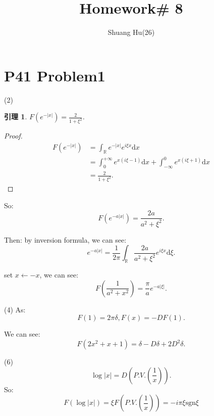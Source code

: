\documentclass[a4paper]{ctexart}
\title{Homework\# 8}
\author{Shuang Hu(26)}
\newtheorem{Lem}{\hspace{2em}引理}
\newcommand{\dif}{\mathrm{d}}
\begin{document}
\maketitle
\section*{P41 Problem1}
(2)

\begin{Lem}
    $F(e^{-|x|})=\frac{2}{1+\xi^{2}}$.
\end{Lem}
\begin{proof}
    \begin{equation}
        \begin{aligned}
            F(e^{-|x|})&=\int_{\mathbb{R}}e^{-|x|}e^{i\xi x}\dif x\\
            &=\int_{0}^{+\infty}e^{x(i\xi-1)}\dif x+\int_{-\infty}^{0}e^{x(i\xi+1)}\dif x\\
            &=\frac{2}{1+\xi^{2}}.
        \end{aligned}
    \end{equation}
\end{proof}
So: 
\begin{equation}
    F(e^{-a|x|})=\frac{2a}{a^{2}+\xi^{2}}.
\end{equation}

Then: by inversion formula, we can see:
\begin{equation}
    e^{-a|x|}=\frac{1}{2\pi}\int_{\mathbb{R}}\frac{2a}{a^{2}+\xi^{2}}e^{i\xi x}\dif\xi.
\end{equation}

set $x\leftarrow -x$, we can see:
\begin{equation}
    F(\frac{1}{a^{2}+x^{2}})=\frac{\pi}{a}e^{-a|\xi|}.
\end{equation}

(4)
As:
\begin{equation}
    F(1)=2\pi\delta, F(x)=-DF(1).
\end{equation}

We can see:
\begin{equation}
    F(2x^{2}+x+1)=\delta-D\delta+2D^{2}\delta.
\end{equation}

(6)
\begin{equation}
    \log|x|=D(P.V.(\frac{1}{x})).
\end{equation}
So:
\begin{equation}
    F(\log|x|)=\xi F(P.V.(\frac{1}{x}))=-i\pi\xi\text{sgn}\xi
\end{equation}
\end{document}
